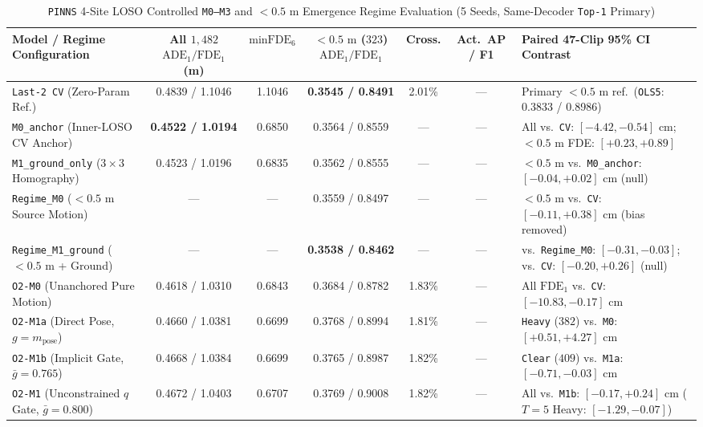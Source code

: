 \documentclass[journal]{IEEEtran}
\begin{document}
\begin{table}[!t]
\centering
\caption{\texttt{PINNS} 4-Site LOSO Controlled \texttt{M0--M3} and $<0.5\text{ m}$ Emergence Regime Evaluation (5 Seeds, Same-Decoder \texttt{Top-1} Primary)}
\label{tab:pinns_m0_m3}
\footnotesize
\begin{tabular}{lcccccl}
\toprule
Model / Regime Configuration & All $1{,}482$ $\text{ADE}_1/\text{FDE}_1$ (m) & $\text{minFDE}_6$ & $<0.5\text{ m}$ ($323$) $\text{ADE}_1/\text{FDE}_1$ & Cross. & Act.\ AP / F1 & Paired 47-Clip 95\% CI Contrast \\
\midrule
\texttt{Last-2 CV} (Zero-Param Ref.) & 0.4839 / 1.1046 & 1.1046 & \textbf{0.3545 / 0.8491} & 2.01\% & --- & Primary $<0.5\text{ m}$ ref.\ (\texttt{OLS5}: 0.3833 / 0.8986) \\
\texttt{M0\_anchor} (Inner-LOSO CV Anchor) & \textbf{0.4522 / 1.0194} & 0.6850 & 0.3564 / 0.8559 & --- & --- & All vs.\ \texttt{CV}: $[-4.42, -0.54]\text{ cm}$; $<0.5\text{ m}$ FDE: $[+0.23, +0.89]$ \\
\texttt{M1\_ground\_only} ($3\times 3$ Homography) & 0.4523 / 1.0196 & 0.6835 & 0.3562 / 0.8555 & --- & --- & $<0.5\text{ m}$ vs.\ \texttt{M0\_anchor}: $[-0.04, +0.02]\text{ cm}$ (null) \\
\texttt{Regime\_M0} ($<0.5\text{ m}$ Source Motion) & --- & --- & 0.3559 / 0.8497 & --- & --- & $<0.5\text{ m}$ vs.\ \texttt{CV}: $[-0.11, +0.38]\text{ cm}$ (bias removed) \\
\texttt{Regime\_M1\_ground} ($<0.5\text{ m}$ + Ground) & --- & --- & \textbf{0.3538 / 0.8462} & --- & --- & vs.\ \texttt{Regime\_M0}: $[-0.31, -0.03]$; vs.\ \texttt{CV}: $[-0.20, +0.26]$ (null) \\
\texttt{O2-M0} (Unanchored Pure Motion) & 0.4618 / 1.0310 & 0.6843 & 0.3684 / 0.8782 & 1.83\% & --- & All $\text{FDE}_1$ vs.\ \texttt{CV}: $[-10.83, -0.17]\text{ cm}$ \\
\texttt{O2-M1a} (Direct Pose, $g = m_{\text{pose}}$) & 0.4660 / 1.0381 & 0.6699 & 0.3768 / 0.8994 & 1.81\% & --- & \texttt{Heavy} ($382$) vs.\ \texttt{M0}: $[+0.51, +4.27]\text{ cm}$ \\
\texttt{O2-M1b} (Implicit Gate, $\bar{g}=0.765$) & 0.4668 / 1.0384 & 0.6699 & 0.3765 / 0.8987 & 1.82\% & --- & \texttt{Clear} ($409$) vs.\ \texttt{M1a}: $[-0.71, -0.03]\text{ cm}$ \\
\texttt{O2-M1} (Unconstrained $q$ Gate, $\bar{g}=0.800$) & 0.4672 / 1.0403 & 0.6707 & 0.3769 / 0.9008 & 1.82\% & --- & All vs.\ \texttt{M1b}: $[-0.17, +0.24]\text{ cm}$ ($T=5$ Heavy: $[-1.29, -0.07]$) \\

\end{tabular}
\end{table}
\end{document}
